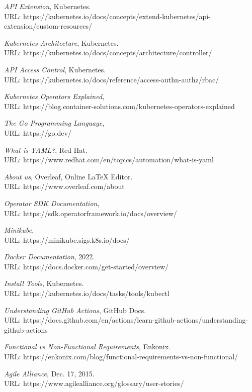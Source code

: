 \documentclass{article}
\begin{document}
\begin{thebibliography}{9}
\emph{API Extension}, Kubernetes. \\URL: https://kubernetes.io/docs/concepts/extend-kubernetes/api-extension/custom-resources/ 
  
\emph{Kubernetes Architecture}, Kubernetes. \\URL: https://kubernetes.io/docs/concepts/architecture/controller/ 
  
\emph{API Access Control}, Kubernetes. \\ URL: https://kubernetes.io/docs/reference/access-authn-authz/rbac/  

\emph{Kubernetes Operators Explained}, \\URL: https://blog.container-solutions.com/kubernetes-operators-explained
  
\emph{The Go Programming Language}, \\URL: https://go.dev/

\emph{What is YAML?}, Red Hat. \\URL: https://www.redhat.com/en/topics/automation/what-is-yaml

\emph{About us}, Overleaf, Online LaTeX Editor. \\URL: https://www.overleaf.com/about 

\emph{Operator SDK Documentation},\\ URL: https://sdk.operatorframework.io/docs/overview/

\emph{Minikube}, \\URL: https://minikube.sigs.k8s.io/docs/

\emph{Docker Documentation}, 2022. \\URL: https://docs.docker.com/get-started/overview/
  
\emph{Install Tools}, Kubernetes. \\URL: https://kubernetes.io/docs/tasks/tools/kubectl

\emph{Understanding GitHub Actions}, GitHub Docs. \\URL: https://docs.github.com/en/actions/learn-github-actions/understanding-github-actions

\emph{Functional vs Non-Functional Requirements}, Enkonix. \\URL: https://enkonix.com/blog/functional-requirements-vs-non-functional/

\emph{Agile Alliance}, Dec. 17, 2015. \\URL: https://www.agilealliance.org/glossary/user-stories/
  


\end{thebibliography}
\end{document}
